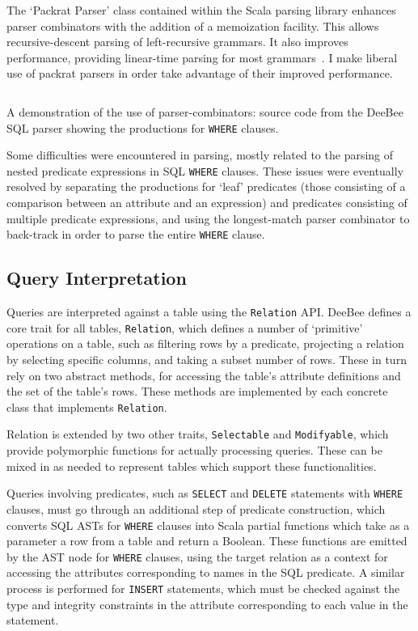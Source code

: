 The `Packrat Parser' class contained within the Scala parsing library enhances parser combinators with the addition of a memoization facility. This allows recursive-descent parsing of left-recursive grammars. It also improves performance, providing linear-time parsing for most grammars~\cite{jonnalagedda2009packrat}. I make liberal use of packrat parsers in order take advantage of their improved performance.

\begin{listing}[H]
    \inputminted[tabsize=2,linenos=true,firstline=165,lastline=188]{scala}{src/main/scala/deebee/sql/SQLParser.scala}
    \caption[A demonstration of the use of parser-combinators]{A demonstration of the use of parser-combinators: source code from the DeeBee SQL parser showing the productions for \texttt{WHERE} clauses.}
    \label{lst:parsing}
    \end{listing}

Some difficulties were encountered in parsing, mostly related to the parsing of nested predicate expressions in SQL \texttt{WHERE} clauses. These issues were eventually resolved by separating the productions for `leaf' predicates (those consisting of a comparison between an attribute and an expression) and predicates consisting of multiple predicate expressions, and using the longest-match parser combinator to back-track in order to parse the entire \texttt{WHERE} clause.

\subsection{Query Interpretation}
\label{sec:query}
Queries are interpreted against a table using the \texttt{Relation} API. DeeBee defines a core trait for all tables, \texttt{Relation}, which defines a number of `primitive' operations on a table, such as filtering rows by a predicate, projecting a relation by selecting specific columns, and taking a subset number of rows. These in turn rely on two abstract methods, for accessing the table's attribute definitions and the set of the table's rows. These methods are implemented by each concrete class that implements \texttt{Relation}.

Relation is extended by two other traits, \texttt{Selectable} and \texttt{Modifyable}, which provide polymorphic functions for actually processing queries. These can be mixed in as needed to represent tables which support these functionalities.

Queries involving predicates, such as \texttt{SELECT} and \texttt{DELETE} statements with \texttt{WHERE} clauses, must go through an additional step of predicate construction, which converts SQL ASTs for \texttt{WHERE} clauses into Scala partial functions which take as a parameter a row from a table and return a Boolean. These functions are emitted by the AST node for \texttt{WHERE} clauses, using the target relation as a context for accessing the attributes corresponding to names in the SQL predicate. A similar process is performed for \texttt{INSERT} statements, which must be checked against the type and integrity constraints in the attribute corresponding to each value in the statement.


